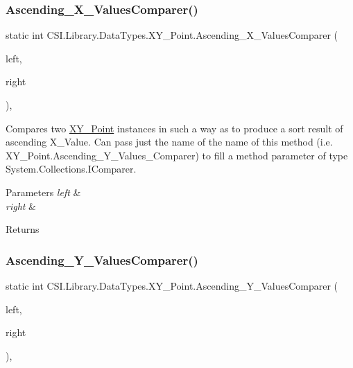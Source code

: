 \subsubsection{\texorpdfstring{Ascending\_X\_ValuesComparer()}{Ascending\_X\_ValuesComparer()}}
{\footnotesize\ttfamily static int C\+S\+I.\+Library.\+Data\+Types.\+X\+Y\+\_\+\+Point.\+Ascending\+\_\+\+X\+\_\+\+Values\+Comparer (\begin{DoxyParamCaption}\item[{\mbox{\hyperlink{struct_c_s_i_1_1_library_1_1_data_types_1_1_x_y___point}{X\+Y\+\_\+\+Point}}}]{left,  }\item[{\mbox{\hyperlink{struct_c_s_i_1_1_library_1_1_data_types_1_1_x_y___point}{X\+Y\+\_\+\+Point}}}]{right }\end{DoxyParamCaption})\hspace{0.3cm}{\ttfamily [inline]}, {\ttfamily [static]}}



Compares two \mbox{\hyperlink{struct_c_s_i_1_1_library_1_1_data_types_1_1_x_y___point}{X\+Y\+\_\+\+Point}} instances in such a way as to produce a sort result of ascending X\+\_\+\+Value. Can pass just the name of the name of this method (i.\+e. X\+Y\+\_\+\+Point.\+Ascending\+\_\+\+Y\+\_\+\+Values\+\_\+\+Comparer) to fill a method parameter of type System.\+Collections.\+I\+Comparer. 


\begin{DoxyParams}{Parameters}
{\em left} & \\
\hline
{\em right} & \\
\hline
\end{DoxyParams}
\begin{DoxyReturn}{Returns}

\end{DoxyReturn}
\mbox{\label{struct_c_s_i_1_1_library_1_1_data_types_1_1_x_y___point_ab6b36557c1c1ae436ca04c0522ab850b}} 
\subsubsection{\texorpdfstring{Ascending\_Y\_ValuesComparer()}{Ascending\_Y\_ValuesComparer()}}
{\footnotesize\ttfamily static int C\+S\+I.\+Library.\+Data\+Types.\+X\+Y\+\_\+\+Point.\+Ascending\+\_\+\+Y\+\_\+\+Values\+Comparer (\begin{DoxyParamCaption}\item[{\mbox{\hyperlink{struct_c_s_i_1_1_library_1_1_data_types_1_1_x_y___point}{X\+Y\+\_\+\+Point}}}]{left,  }\item[{\mbox{\hyperlink{struct_c_s_i_1_1_library_1_1_data_types_1_1_x_y___point}{X\+Y\+\_\+\+Point}}}]{right }\end{DoxyParamCaption})\hspace{0.3cm}{\ttfamily [inline]}, {\ttfamily [static]}}



